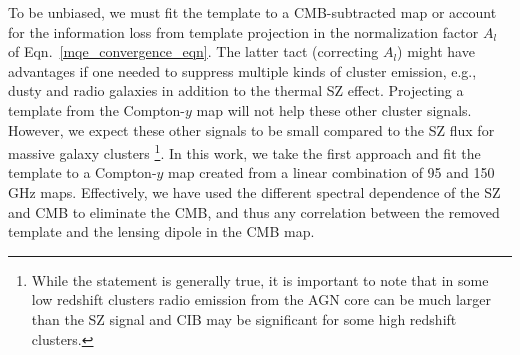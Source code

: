To be unbiased, we must fit the template to a CMB-subtracted map or account for the information loss from template projection in the normalization factor $A_l$ of Eqn.~\ref{mqe_convergence_eqn}. 
The latter tact (correcting $A_l$) might have advantages if one needed to suppress multiple kinds of cluster emission, e.g., dusty and radio galaxies in addition to the thermal SZ effect. 
Projecting a template from the Compton-$y$ map will not help these other cluster signals. 
However, we expect these other signals to be small compared to the SZ flux for massive galaxy clusters \footnote{While the statement is generally true, it is important to note that in some low redshift clusters radio emission from the AGN core can be much larger than the SZ signal and CIB may be significant for some high redshift clusters.}. %
In this work, we take the first approach and fit the template to a Compton-$y$ map created from a linear combination of 95 and 150\,GHz maps. 
Effectively, we have used the different spectral dependence of the SZ and CMB to eliminate the CMB, and thus any correlation between the removed template and the lensing dipole in the CMB map. 

